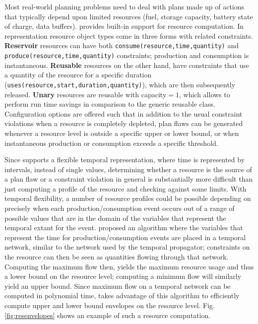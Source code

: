Most real-world planning problems need to deal with plans made up of
actions that typically depend upon limited resources (\eg fuel,
storage capacity, battery state of charge, data buffers).  \eu
provides built-in support for resource computation. In \eus
representation resource object types come in three forms with related
constraints. \textbf{Reservoir} resources can have both
\texttt{consume(resource,time,quantity)} and
\texttt{produce(resource,time,quantity)} constraints; production and
consumption is instantaneous. \textbf{Reusable} resources on the other
hand, have constraints that use a quantity of the resource for a
specific duration (\texttt{uses(resource,start,duration,quantity)}),
which are then subsequently released. \textbf {Unary} resources are
reusable with capacity$ = 1$, which allows \eu to perform run time
savings in comparison to the generic reusable class. Configuration
options are offered such that in addition to the usual constraint
violations when a resource is completely depleted, plan flaws can be
generated whenever a resource level is outside a specific upper or
lower bound, or when instantaneous production or consumption exceeds a
specific threshold.

Since \eu supports a flexible temporal representation, where time is
represented by intervals, instead of single values, determining
whether a resource is the source of a plan flaw or a constraint
violation in general is substantially more difficult than just
computing a profile of the resource and checking against some limits.
With temporal flexibility, a number of resource profiles could be
possible depending on precisely when each production/consumption event
occurs out of a range of possible values that are in the domain of the
variables that represent the temporal extant for the event.
\cite{Muscettola04,Muscettola06} proposed an algorithm where the
variables that represent the time for production/consumption events
are placed in a temporal network, similar to the network used by the
temporal propagator; constraints on the resource can then be seen as
quantities flowing through that network. Computing the maximum flow
then, yields the maximum resource usage and thus a lower bound on the
resource level; computing a minimum flow will similarly yield an upper
bound. Since maximum flow on a temporal network can be computed in
polynomial time, \eu takes advantage of this algorithm to efficiently
compute upper and lower bound envelopes on the resource
level. Fig. \ref{fig:resenvelopes} shows an example of such a resource
computation.


